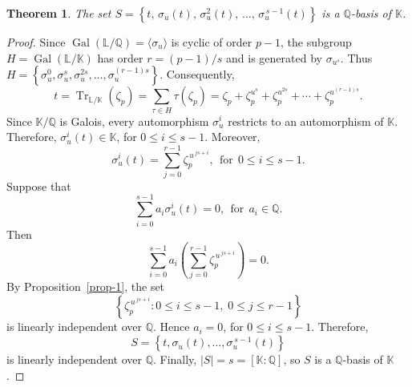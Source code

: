 \documentclass[10pt,a4paper]{amsart}
\newtheorem{theorem}{Theorem}
\begin{document}
\begin{theorem}\label{teo-1} The set $S = \left\{t,\,\sigma_u(t),\,\sigma_u^{2}(t),\,\ldots,\,\sigma_u^{\,s-1}(t)\right\}$ is a $\mathbb{Q}$-basis of $\mathbb{K}$. \end{theorem}
\begin{proof} Since $\operatorname{Gal}(\mathbb{L}/\mathbb{Q}) = \langle\sigma_u\rangle$ is cyclic of order $p-1$, the subgroup $H=\operatorname{Gal}(\mathbb{L}/\mathbb{K})$
has order $r=(p-1)/s$ and is generated by $\sigma_{u^s}$. Thus $H = \left\{ \sigma_u^0,\sigma_{u}^s,\sigma_{u}^{2s},\ldots,\sigma_{u}^{(r-1)s}\right\}$. Consequently, \[ t = \operatorname{Tr}_{\mathbb{L}/\mathbb{K}}(\zeta_p) = \sum_{\tau\in H}\tau(\zeta_p) =
\zeta_p+\zeta_p^{u^s}+\zeta_p^{u^{2s}}+\cdots+\zeta_p^{u^{(r-1)s}}. \] Since $\mathbb{K}/\mathbb{Q}$ is Galois, every automorphism $\sigma_u^i$ restricts to an automorphism of $\mathbb{K}$. Therefore,
$\sigma_u^i(t)\in\mathbb{K}$, for $0\le i\le s-1$. Moreover, \[ \sigma_u^i(t) = \sum_{j=0}^{r-1} \zeta_p^{\,u^{\,js+i}}, \ \ \mbox{for} \ \ 0\le i\le s-1. \]
Suppose that \[ \sum_{i=0}^{s-1} a_i\sigma_u^i(t)=0, \ \ \mbox{for} \ \ a_i\in\mathbb{Q}. \] Then \[ \sum_{i=0}^{s-1} a_i \left(
\sum_{j=0}^{r-1} \zeta_p^{\,u^{\,js+i}} \right) = 0. \] By Proposition~\ref{prop-1}, the set \[ \left\{ \zeta_p^{\,u^{\,js+i}}: 0\le i\le s-1,\; 0\le j\le r-1\right\} \]
is linearly independent over $\mathbb{Q}$. Hence $a_i=0$, for $0\le i\le s-1$. Therefore, \[ S = \left\{ t,\sigma_u(t),\ldots,\sigma_u^{\,s-1}(t) \right\} \] is linearly independent over $\mathbb{Q}$.
Finally, $|S| = s = [\mathbb{K}:\mathbb{Q}]$, so $S$ is a $\mathbb{Q}$-basis of $\mathbb{K}$. \end{proof}
\end{document}
